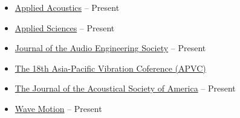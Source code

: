 \documentclass[10pt,a4paper,ragged2e,withhyper]{altacv}
\newcommand{\hrefhl}[2]{{\color{accent}\href{#1}{#2}}}
\begin{document}
\begin{itemize}
    \item \hrefhl{https://www.journals.elsevier.com/applied-acoustics}{Applied Acoustics} \hfill {} -- Present

    \item \hrefhl{https://www.mdpi.com/journal/applsci}{Applied Sciences} \hfill {} -- Present


    \item \hrefhl{https://www.aes.org/journal/}{Journal of the Audio Engineering Society} \hfill {} -- Present

    \item \hrefhl{https://www.amazon.com/Vibration-Engineering-Sustainable-Future-Passive/dp/3030476170}{The 18th Asia-Pacific Vibration Coference (APVC)} \hfill {} 
    \item \hrefhl{https://asa.scitation.org/journal/jas}{The Journal of the Acoustical Society of America} \hfill {} -- Present

    \item \hrefhl{https://www.sciencedirect.com/journal/wave-motion}{Wave Motion} \hfill {} -- Present

\end{itemize}


\end{document}
